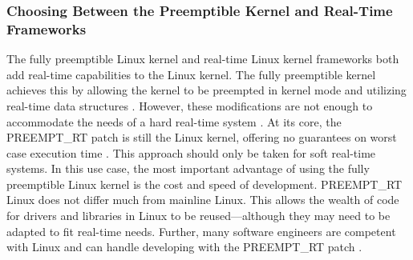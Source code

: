             \markboth{}{}
            \subsubsection{Choosing Between the Preemptible Kernel and Real-Time Frameworks}
            \markboth{}{}
                The fully preemptible Linux kernel and real-time Linux kernel
                    frameworks both add real-time capabilities to the Linux
                    kernel.
                The fully preemptible kernel achieves this by allowing the
                    kernel to be preempted in kernel mode and utilizing
                    real-time data structures \cite{linux-preemption-models}.
                However, these modifications are not enough to accommodate the
                    needs of a hard real-time system \cite{preempt-rt-survey}.
                At its core, the PREEMPT\_RT patch is still the Linux kernel,
                    offering no guarantees on worst case execution time
                    \cite{preempt-rt-survey}.
                This approach should only be taken for soft real-time systems.
                In this use case, the most important advantage of using the
                    fully preemptible Linux kernel is the cost and speed of
                    development.
                PREEMPT\_RT Linux does not differ much from mainline Linux.
                This allows the wealth of code for drivers and libraries in
                    Linux to be reused---although they may need to be adapted to
                    fit real-time needs.
                Further, many software engineers are competent with Linux and
                    can handle developing with the PREEMPT\_RT patch
                    \cite{preempt-rt-survey}.

